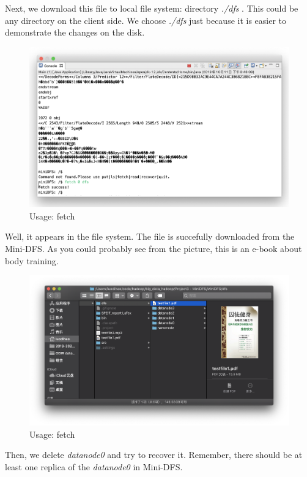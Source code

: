 \documentclass[10pt]{article}
\begin{document}
Next, we download this file to local file system: directory \textit{./dfs} .
This could be any directory on the client side. We choose \textit{./dfs} just because
it is easier to demonstrate the changes on the disk.

\begin{figure}[H]
\centerline{\includegraphics[width = 1\textwidth]{screenshot//fetch_01.png}}
\caption{Usage: fetch}
\end{figure}

Well, it appears in the file system. The file is succefully downloaded from the Mini-DFS.
As you could probably see from the picture, this is an e-book about body training.

\begin{figure}[H]
\centerline{\includegraphics[width = 1\textwidth]{screenshot//fetch_02.png}}
\caption{Usage: fetch}
\end{figure}

Then, we delete \textit{datanode0} and try to recover it. Remember, there should be at least
one replica of the \textit{datanode0} in Mini-DFS.
\end{document}
